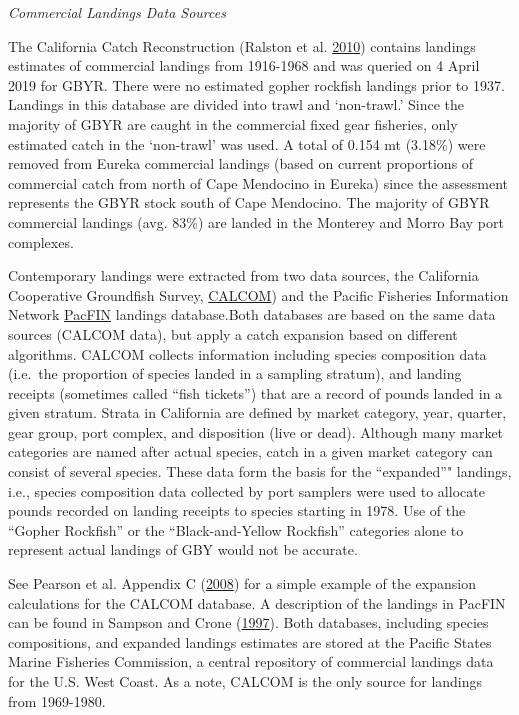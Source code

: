 \documentclass[12pt,]{article}
\begin{document}
\emph{Commercial Landings Data Sources}

The California Catch Reconstruction (Ralston et al.
\protect\hyperlink{ref-Ralston2010}{2010}) contains landings estimates
of commercial landings from 1916-1968 and was queried on 4 April 2019
for GBYR. There were no estimated gopher rockfish landings prior to
1937. Landings in this database are divided into trawl and `non-trawl.'
Since the majority of GBYR are caught in the commercial fixed gear
fisheries, only estimated catch in the `non-trawl' was used. A total of
0.154 mt (3.18\%) were removed from Eureka commercial landings (based on
current proportions of commercial catch from north of Cape Mendocino in
Eureka) since the assessment represents the GBYR stock south of Cape
Mendocino. The majority of GBYR commercial landings (avg. 83\%) are
landed in the Monterey and Morro Bay port complexes.

Contemporary landings were extracted from two data sources, the
California Cooperative Groundfish Survey,
\href{https://calcom.psmfc.org/}{CALCOM}) and the Pacific Fisheries
Information Network \href{https://pacfin.psmfc.org/}{PacFIN} landings
database.Both databases are based on the same data sources (CALCOM
data), but apply a catch expansion based on different algorithms. CALCOM
collects information including species composition data (i.e.~the
proportion of species landed in a sampling stratum), and landing
receipts (sometimes called ``fish tickets'') that are a record of pounds
landed in a given stratum. Strata in California are defined by market
category, year, quarter, gear group, port complex, and disposition (live
or dead). Although many market categories are named after actual
species, catch in a given market category can consist of several
species. These data form the basis for the ``expanded''" landings, i.e.,
species composition data collected by port samplers were used to
allocate pounds recorded on landing receipts to species starting in
1978. Use of the ``Gopher Rockfish'' or the ``Black-and-Yellow
Rockfish'' categories alone to represent actual landings of GBY would
not be accurate.

See Pearson et al. Appendix C
(\protect\hyperlink{ref-Pearson2008}{2008}) for a simple example of the
expansion calculations for the CALCOM database. A description of the
landings in PacFIN can be found in Sampson and Crone
(\protect\hyperlink{ref-Sampson1997}{1997}). Both databases, including
species compositions, and expanded landings estimates are stored at the
Pacific States Marine Fisheries Commission, a central repository of
commercial landings data for the U.S. West Coast. As a note, CALCOM is
the only source for landings from 1969-1980.
\end{document}
